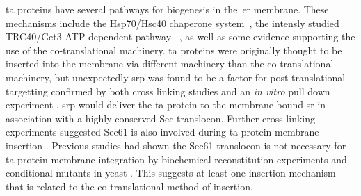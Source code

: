 \gls{ta} proteins have several pathways for biogenesis in the~\gls{er} membrane.
These mechanisms include the Hsp70/Hsc40 chaperone system~\cite{Rabu2008}, the intensly studied TRC40/Get3 ATP dependent pathway ~\cite{Johnson2013, Chartron2012, Wang2014}, as well as some evidence supporting the use of the co-translational machinery.
\gls{ta} proteins were originally thought to be inserted into the membrane via different machinery than the co-translational machinery, but unexpectedly \gls{srp} was found to be a factor for post-translational targetting confirmed by both cross linking studies \cite{Abell2004} and an \textit{in vitro} pull down experiment \cite{Leznicki2010}.
\gls{srp} would deliver the \gls{ta} protein to the membrane bound \gls{sr} in association with a highly conserved Sec translocon.
Further cross-linking experiments suggested Sec61 is also involved during \gls{ta} protein membrane insertion \cite{Abell2003}.
Previous studies had shown the Sec61 translocon is not necessary for \gls{ta} protein membrane integration by biochemical reconstitution experiments \cite{Kutay1993} and conditional mutants in yeast \cite{Steel2002, Yabal2003}. %
This suggests at least one insertion mechanism that is related to the co-translational method of insertion.

